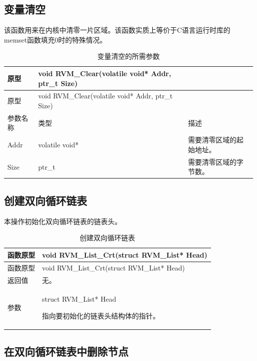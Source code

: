 \subsection{变量清空}\label{subsec:3-6-1}

该函数用来在内核中清零一片区域。该函数实质上等价于C语言运行时库的memset函数填充0时的特殊情况。

\begin{xltabular}{\textwidth}{@{}>{\hsize\raggedright\arraybackslash}X>{\hsize\raggedright\arraybackslash}X>{\hsize\raggedright\arraybackslash}X@{}}
\caption{变量清空的所需参数}\label{tab:3-14}\\
\toprule
原型 & void RVM\_\allowbreak{}Clear(volatile void* Addr, ptr\_\allowbreak{}t Size)
&\tabularnewline
\endfirsthead
\toprule
原型 & void RVM\_\allowbreak{}Clear(volatile void* Addr, ptr\_\allowbreak{}t Size)
&\tabularnewline
\midrule
\endhead
\bottomrule
\endlastfoot
参数名称 & 类型 & 描述\tabularnewline
Addr & volatile void* & 需要清零区域的起始地址。\tabularnewline
Size & ptr\_\allowbreak{}t & 需要清零区域的字节数。\tabularnewline
\end{xltabular}

\subsection{创建双向循环链表}\label{subsec:3-6-2}

本操作初始化双向循环链表的链表头。

\begin{xltabular}{\textwidth}{@{}>{\hsize\raggedright\arraybackslash}X>{\hsize\raggedright\arraybackslash}X@{}}
\caption{创建双向循环链表}\label{tab:3-15}\\
\toprule
函数原型 & void RVM\_\allowbreak{}List\_\allowbreak{}Crt(struct RVM\_\allowbreak{}List* Head)\tabularnewline
\endfirsthead
\toprule
函数原型 & void RVM\_\allowbreak{}List\_\allowbreak{}Crt(struct RVM\_\allowbreak{}List* Head)\tabularnewline
\midrule
\endhead
\bottomrule
\endlastfoot
返回值 & 无。\tabularnewline
参数\strut
 & struct RVM\_\allowbreak{}List* Head

指向要初始化的链表头结构体的指针。\strut
\tabularnewline
\end{xltabular}

\subsection{在双向循环链表中删除节点}\label{subsec:3-6-3}

